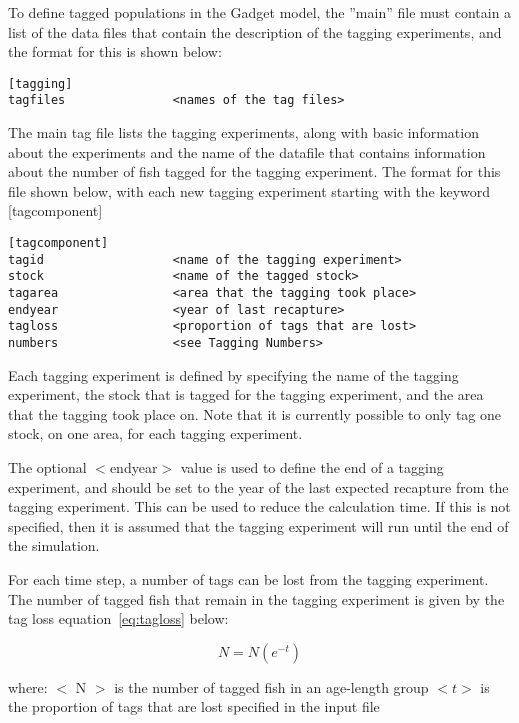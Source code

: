 \documentclass [a4paper, 10pt]{book}
\begin{document}
\bigskip
To define tagged populations in the Gadget model, the ''main'' file must contain a list of the data files that contain the description of the tagging experiments, and the format for this is shown below:

{\small\begin{verbatim}
[tagging]
tagfiles               <names of the tag files>
\end{verbatim}}

The main tag file lists the tagging experiments, along with basic information about the experiments and the name of the datafile that contains information about the number of fish tagged for the tagging experiment.  The format for this file shown below, with each new tagging experiment starting with the keyword [tagcomponent]

{\small\begin{verbatim}
[tagcomponent]
tagid                  <name of the tagging experiment>
stock                  <name of the tagged stock>
tagarea                <area that the tagging took place>
endyear                <year of last recapture>
tagloss                <proportion of tags that are lost>
numbers                <see Tagging Numbers>
\end{verbatim}}

Each tagging experiment is defined by specifying the name of the tagging experiment, the stock that is tagged for the tagging experiment, and the area that the tagging took place on.  Note that it is currently possible to only tag one stock, on one area, for each tagging experiment.

\bigskip
The optional $<$endyear$>$ value is used to define the end of a tagging experiment, and should be set to the year of the last expected recapture from the tagging experiment.  This can be used to reduce the calculation time.  If this is not specified, then it is assumed that the tagging experiment will run until the end of the simulation.

\bigskip
For each time step, a number of tags can be lost from the tagging experiment.  The number of tagged fish that remain in the tagging experiment is given by the tag loss equation~\ref{eq:tagloss} below:

\begin{equation}\label{eq:tagloss}
N = N (e^{-t})
\end{equation}

where:\newline
$<$ N $>$ is the number of tagged fish in an age-length group\newline
$<t>$ is the proportion of tags that are lost specified in the input file
\end{document}
